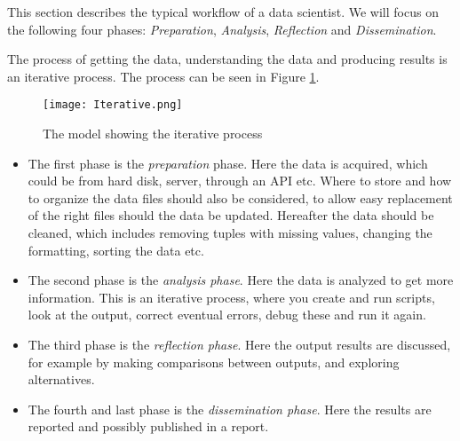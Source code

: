 \documentclass[Report.tex]{subfiles}
\begin{document}
This section describes the typical workflow of a data scientist. We will focus on the following four phases: \emph{Preparation}, \emph{Analysis}, \emph{Reflection} and \emph{Dissemination}.

The process of getting the data, understanding the data and producing results is an iterative process. The process can be seen in Figure \ref{Fig:Iterative}.

\begin{figure}
\center
\texttt{[image: Iterative.png]}
\caption{The model showing the iterative process \cite[Chapter 2]{Guo}}
\label{Fig:Iterative}
\end{figure}
\begin{itemize}


\item The first phase is the \emph{preparation} phase. Here the data is acquired, which could be from hard disk, server, through an API etc. Where to store and how to organize the data files should also be considered, to allow easy replacement of the right files should the data be updated. Hereafter the data should be cleaned, which includes removing tuples with missing values, changing the formatting, sorting the data etc.


\item The second phase is the \emph{analysis phase}. Here the data is analyzed to get more information. This is an iterative process, where you create and run scripts,  look at the output, correct eventual errors, debug these and run it again. 

\item The third phase is the \emph{reflection phase}. Here the output results are discussed, for example by making comparisons between outputs, and exploring alternatives.

\item The fourth and last phase is the \emph{dissemination phase}. Here the results are reported and possibly published in a report.
\cite[Chapter 2]{Guo}


\end{itemize}
\end{document}
